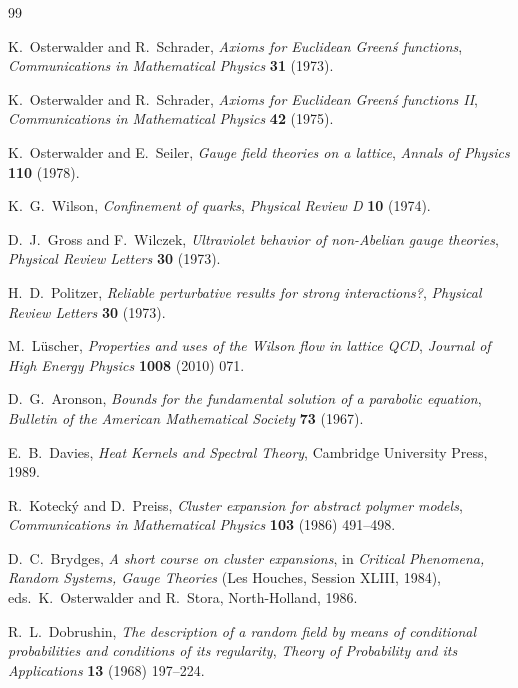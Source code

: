 \begin{thebibliography}{99}

K.~Osterwalder and R.~Schrader,
\newblock \emph{Axioms for Euclidean Green\'s functions},
\newblock \emph{Communications in Mathematical Physics} \textbf{31} (1973).

K.~Osterwalder and R.~Schrader,
\newblock \emph{Axioms for Euclidean Green\'s functions II},
\newblock \emph{Communications in Mathematical Physics} \textbf{42} (1975).

K.~Osterwalder and E.~Seiler,
\newblock \emph{Gauge field theories on a lattice},
\newblock \emph{Annals of Physics} \textbf{110} (1978).

K.~G.~Wilson,
\newblock \emph{Confinement of quarks},
\newblock \emph{Physical Review D} \textbf{10} (1974).

D.~J.~Gross and F.~Wilczek,
\newblock \emph{Ultraviolet behavior of non-Abelian gauge theories},
\newblock \emph{Physical Review Letters} \textbf{30} (1973).

H.~D.~Politzer,
\newblock \emph{Reliable perturbative results for strong interactions?},
\newblock \emph{Physical Review Letters} \textbf{30} (1973).

M.~L\"uscher,
\newblock \emph{Properties and uses of the Wilson flow in lattice QCD},
\newblock \emph{Journal of High Energy Physics} \textbf{1008} (2010) 071.

D.~G.~Aronson,
\newblock \emph{Bounds for the fundamental solution of a parabolic equation},
\newblock \emph{Bulletin of the American Mathematical Society} \textbf{73} (1967).

E.~B.~Davies,
\newblock \emph{Heat Kernels and Spectral Theory},
\newblock Cambridge University Press, 1989.

R.~Koteck\'y and D.~Preiss,
\newblock \emph{Cluster expansion for abstract polymer models},
\newblock \emph{Communications in Mathematical Physics} \textbf{103} (1986) 491--498.

D.~C.~Brydges,
\newblock \emph{A short course on cluster expansions},
\newblock in \emph{Critical Phenomena, Random Systems, Gauge Theories} (Les Houches, Session XLIII, 1984),
  eds.~K.~Osterwalder and R.~Stora, North-Holland, 1986.

R.~L.~Dobrushin,
\newblock \emph{The description of a random field by means of conditional probabilities and conditions of its regularity},
\newblock \emph{Theory of Probability and its Applications} \textbf{13} (1968) 197--224.


\end{thebibliography}
